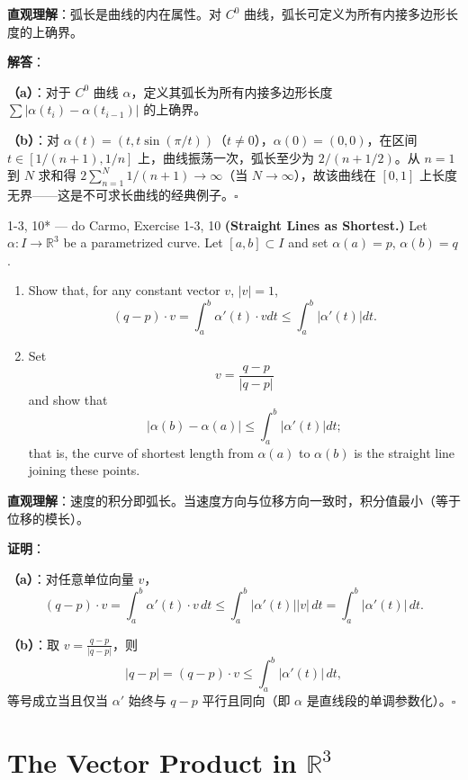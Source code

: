 \begin{solution}
\textbf{直观理解}：弧长是曲线的内在属性。对 $C^0$ 曲线，弧长可定义为所有内接多边形长度的上确界。

\textbf{解答}：

\textbf{（a）}：对于 $C^0$ 曲线 $\alpha$，定义其弧长为所有内接多边形长度 $\sum |\alpha(t_i) - \alpha(t_{i-1})|$ 的上确界。

\textbf{（b）}：对 $\alpha(t) = (t, t\sin(\pi/t))$（$t \neq 0$），$\alpha(0) = (0,0)$，在区间 $t \in [1/(n+1), 1/n]$ 上，曲线振荡一次，弧长至少为 $2/(n+1/2)$。从 $n=1$ 到 $N$ 求和得 $2\sum_{n=1}^N 1/(n+1) \to \infty$（当 $N \to \infty$），故该曲线在 $[0,1]$ 上长度无界——这是不可求长曲线的经典例子。$\square$
\end{solution}

\begin{exercise}{1-3, 10* — do Carmo, Exercise 1-3, 10}
\textbf{(Straight Lines as Shortest.)} Let $\alpha: I \to \mathbb{R}^3$ be a parametrized curve. Let $[a, b] \subset I$ and set $\alpha(a) = p$, $\alpha(b) = q$.
\begin{enumerate}
\item[a.] Show that, for any constant vector $v$, $|v| = 1$,
\[
(q - p) \cdot v = \int_a^b \alpha'(t) \cdot v dt \leq \int_a^b |\alpha'(t)| dt.
\]
\item[b.] Set
\[
v = \frac{q - p}{|q - p|}
\]
and show that
\[
|\alpha(b) - \alpha(a)| \leq \int_a^b |\alpha'(t)| dt;
\]
that is, the curve of shortest length from $\alpha(a)$ to $\alpha(b)$ is the straight line joining these points.
\end{enumerate}
\end{exercise}

\begin{solution}
\textbf{直观理解}：速度的积分即弧长。当速度方向与位移方向一致时，积分值最小（等于位移的模长）。

\textbf{证明}：

\textbf{（a）}：对任意单位向量 $v$，
\[
(q - p) \cdot v = \int_a^b \alpha'(t) \cdot v\, dt \leq \int_a^b |\alpha'(t)||v|\, dt = \int_a^b |\alpha'(t)|\, dt.
\]

\textbf{（b）}：取 $v = \frac{q-p}{|q-p|}$，则
\[
|q-p| = (q-p) \cdot v \leq \int_a^b |\alpha'(t)|\, dt,
\]
等号成立当且仅当 $\alpha'$ 始终与 $q-p$ 平行且同向（即 $\alpha$ 是直线段的单调参数化）。$\square$
\end{solution}

\section{The Vector Product in $\mathbb{R}^3$}\label{sec:vector-product-ch1}

